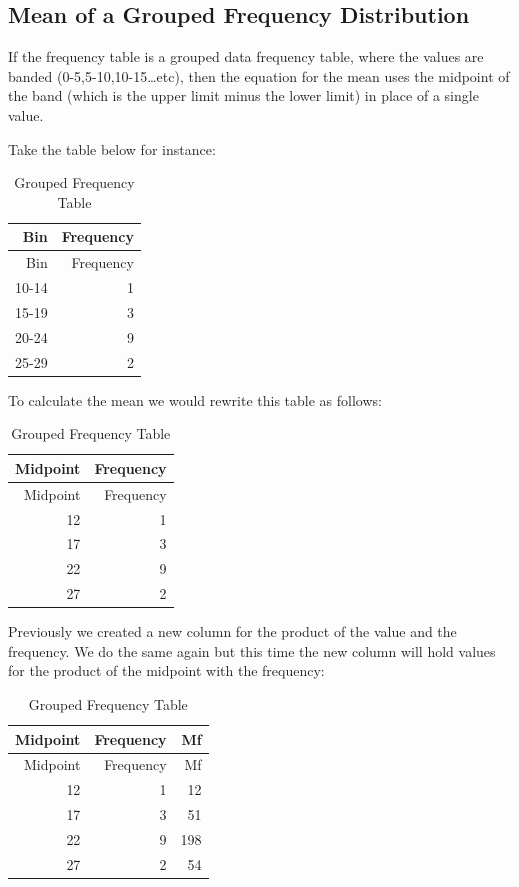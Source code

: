 \documentclass[
]{book}
\begin{document}
\hypertarget{mean-of-a-grouped-frequency-distribution}{%
\subsection{Mean of a Grouped Frequency Distribution}\label{mean-of-a-grouped-frequency-distribution}}

If the frequency table is a grouped data frequency table, where the values are banded (0-5,5-10,10-15\ldots etc), then the equation for the mean uses the midpoint of the band (which is the upper limit minus the lower limit) in place of a single value.

Take the table below for instance:

\begin{longtable}[]{@{}rr@{}}
\caption{\label{tab:table0007}Grouped Frequency Table}\tabularnewline
\toprule
Bin & Frequency \\
\midrule
\endfirsthead
\toprule
Bin & Frequency \\
\midrule
\endhead
10-14 & 1 \\
15-19 & 3 \\
20-24 & 9 \\
25-29 & 2 \\
\bottomrule
\end{longtable}

To calculate the mean we would rewrite this table as follows:

\begin{longtable}[]{@{}rr@{}}
\caption{\label{tab:table00007}Grouped Frequency Table}\tabularnewline
\toprule
Midpoint & Frequency \\
\midrule
\endfirsthead
\toprule
Midpoint & Frequency \\
\midrule
\endhead
12 & 1 \\
17 & 3 \\
22 & 9 \\
27 & 2 \\
\bottomrule
\end{longtable}

Previously we created a new column for the product of the value and the frequency. We do the same again but this time the new column will hold values for the product of the midpoint with the frequency:

\begin{longtable}[]{@{}rrr@{}}
\caption{\label{tab:table000007}Grouped Frequency Table}\tabularnewline
\toprule
Midpoint & Frequency & Mf \\
\midrule
\endfirsthead
\toprule
Midpoint & Frequency & Mf \\
\midrule
\endhead
12 & 1 & 12 \\
17 & 3 & 51 \\
22 & 9 & 198 \\
27 & 2 & 54 \\
\bottomrule
\end{longtable}
\end{document}
